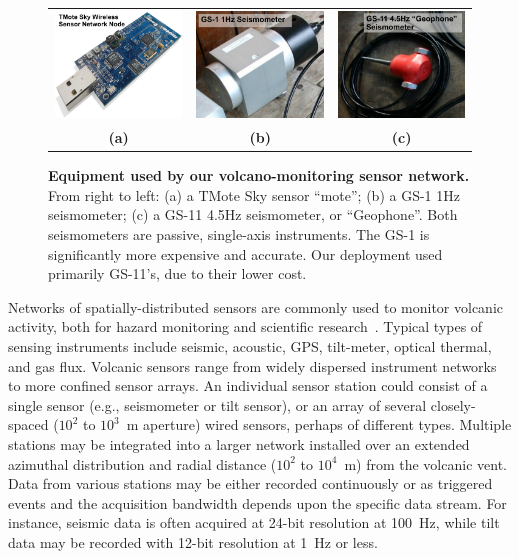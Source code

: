 \begin{figure}[t] 
\begin{center} 
\begin{tabular}{ccc}
\includegraphics[width=0.3\hsize]{./2-related/figs/TMoteSky.pdf} &
\includegraphics[width=0.3\hsize]{./2-related/figs/GS1.pdf} &
\includegraphics[width=0.3\hsize]{./2-related/figs/GS11.pdf} \\
\textbf{(a)} & \textbf{(b)} & \textbf{(c)} \\
\end{tabular}
\end{center} 

\caption{\textbf{Equipment used by our volcano-monitoring sensor network.}
From right to left: (a) a TMote Sky sensor ``mote''; (b) a GS-1 1Hz
seismometer; (c) a GS-11 4.5Hz seismometer, or ``Geophone''. Both
seismometers are passive, single-axis instruments. The GS-1 is significantly
more expensive and accurate. Our deployment used primarily GS-11's, due to
their lower cost.}

\label{introduction-fig-cartoon} 
\end{figure}

Networks of spatially-distributed sensors are commonly used to monitor
volcanic activity, both for hazard monitoring and scientific
research~\cite{Scarpa96}. Typical types of sensing instruments include
seismic, acoustic, GPS, tilt-meter, optical thermal, and gas flux. Volcanic
sensors range from widely dispersed instrument networks to more confined
sensor arrays. An individual sensor station could consist of a single sensor
(e.g., seismometer or tilt sensor), or an array of several closely-spaced
($10^2$ to $10^3$~m aperture) wired sensors, perhaps of different types.
Multiple stations may be integrated into a larger network installed over an
extended azimuthal distribution and radial distance ($10^2$ to $10^4$~m) from
the volcanic vent. Data from various stations may be either recorded
continuously or as triggered events and the acquisition bandwidth depends
upon the specific data stream. For instance, seismic data is often acquired
at 24-bit resolution at 100~Hz, while tilt data may be recorded with 12-bit
resolution at 1~Hz or less.

